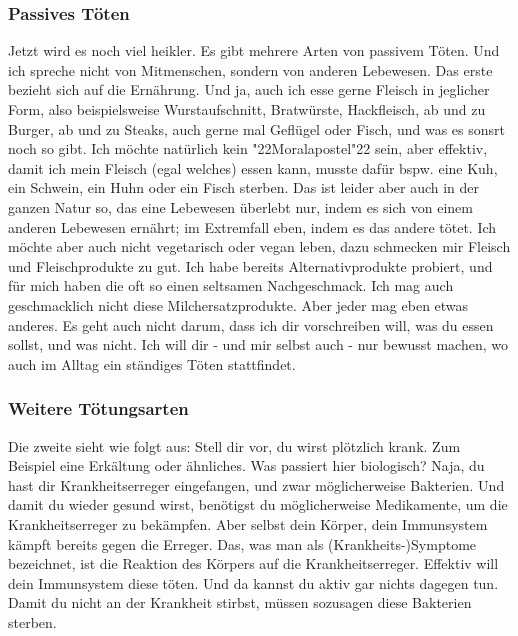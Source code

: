 \documentclass[10pt,a5paper]{article}
\newcommand{\q}[1]{\char"22{#1}\char"22 }
\begin{document}
	\subsubsection{Passives T\"oten}
		Jetzt wird es noch viel heikler.
		Es gibt mehrere Arten von passivem T\"oten.
		Und ich spreche nicht von Mitmenschen,
		sondern von anderen Lebewesen.
		Das erste bezieht sich auf die Ern\"ahrung.
		Und ja,
		auch ich esse gerne Fleisch in jeglicher Form,
		also beispielsweise Wurstaufschnitt,
		Bratw\"urste,
		Hackfleisch,
		ab und zu Burger,
		ab und zu Steaks,
		auch gerne mal Gefl\"ugel oder Fisch,
		und was es sonsrt noch so gibt.
		Ich m\"ochte nat\"urlich kein \q{Moralapostel} sein,
		aber effektiv,
		damit ich mein Fleisch (egal welches) essen kann,
		musste daf\"ur bspw. eine Kuh,
		ein Schwein,
		ein Huhn oder ein Fisch sterben.
		Das ist leider aber auch in der ganzen Natur so,
		das eine Lebewesen \"uberlebt nur,
		indem es sich von einem anderen Lebewesen ern\"ahrt;
		im Extremfall eben,
		indem es das andere t\"otet.
		Ich m\"ochte aber auch nicht vegetarisch oder vegan leben,
		dazu schmecken mir Fleisch und Fleischprodukte zu gut.
		Ich habe bereits Alternativprodukte probiert,
		und f\"ur mich haben die oft so einen seltsamen Nachgeschmack.
		Ich mag auch geschmacklich nicht diese Milchersatzprodukte.
		Aber jeder mag eben etwas anderes.
		Es geht auch nicht darum,
		dass ich dir vorschreiben will,
		was du essen sollst,
		und was nicht.
		Ich will dir - und mir selbst auch - nur bewusst machen,
		wo auch im Alltag ein st\"andiges T\"oten stattfindet.
		
	\subsubsection{Weitere T\"otungsarten}
		Die zweite sieht wie folgt aus:
		Stell dir vor,
		du wirst pl\"otzlich krank.
		Zum Beispiel eine Erk\"altung oder \"ahnliches.
		Was passiert hier biologisch?
		Naja,
		du hast dir Krankheitserreger eingefangen,
		und zwar m\"oglicherweise Bakterien.
		Und damit du wieder gesund wirst,
		ben\"otigst du m\"oglicherweise Medikamente,
		um die Krankheitserreger zu bek\"ampfen.
		Aber selbst dein K\"orper,
		dein Immunsystem k\"ampft bereits gegen die Erreger.
		Das,
		was man als (Krankheits-)Symptome bezeichnet,
		ist die Reaktion des K\"orpers auf die Krankheitserreger.
		Effektiv will dein Immunsystem diese t\"oten.
		Und da kannst du aktiv gar nichts dagegen tun.
		Damit du nicht an der Krankheit stirbst,
		m\"ussen sozusagen diese Bakterien sterben.
\end{document}
